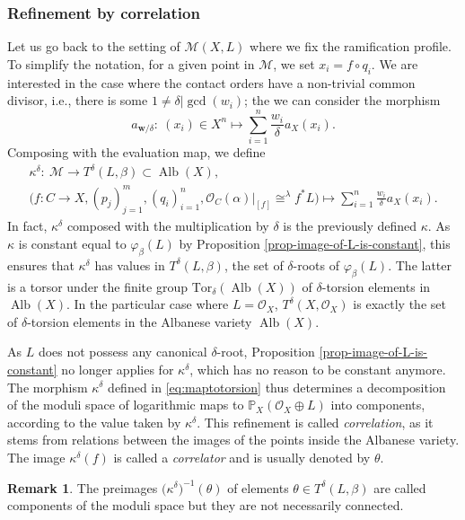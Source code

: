 \documentclass[pdftex]{sigma}
\newcommand{\Tor}{\mathrm{Tor}}
\newcommand{\Alb}{\operatorname{Alb}}
\newcommand{\bfw}{ {\boldsymbol w} }
\newcommand{\M}{\mathcal{M}}
\renewcommand{\O}{\mathcal{O}}
\numberwithin{equation}{section}
\theoremstyle{definition}
\newtheorem{remarkk}[theo]{Remark}
\begin{document}
\subsubsection{Refinement by correlation}\label{sec:correlationrefinement}
Let us go back to the setting of $\M(X,L)$ where we fix the ramification profile. To simplify the notation, for a given point in $\M$, we set $x_i=f\circ q_i$. We are interested in the case where the contact orders have a non-trivial common divisor, i.e., there is some $1\neq\delta|\gcd(w_i)$; the we can consider the morphism
\[ a_{\bfw/\delta}\colon\ (x_i)\in X^n\longmapsto \sum_{i=1}^n \frac{w_i}{\delta}a_X(x_i). \]
Composing with the evaluation map, we define
\begin{gather}
 \kappa^\delta \colon\ \M \longrightarrow T^\delta(L,\beta)\subset\Alb(X), \nonumber\\
 \bigl(f\colon C\to X,(p_j)_{j=1}^m,(q_i)_{i=1}^n, \O_C(\alpha)\rvert_{[f]}\cong^{\lambda}f^*L\bigr) \longmapsto \sum_{i=1}^n\frac{w_i}{\delta} a_X (x_i)
.\label{eq:maptotorsion}
\end{gather}
In fact, $\kappa^\delta$ composed with the multiplication by $\delta$ is the previously defined $\kappa$. As $\kappa$ is constant equal to $\varphi_\beta(L)$ by Proposition \ref{prop-image-of-L-is-constant}, this ensures that $\kappa^\delta$ has values in $ T^\delta(L,\beta)$, the set of $\delta$-roots of $\varphi_\beta(L)$. The latter is a torsor under the finite group $\Tor_\delta(\Alb(X))$ of $\delta$-torsion elements in~$\Alb(X)$. In the particular case where $L=\mathcal O_X$, $T^\delta(X,\O_X)$ is exactly the set of $\delta$-torsion elements in the Albanese variety $\Alb(X)$.



As $L$ does not possess any canonical $\delta$-root, Proposition \ref{prop-image-of-L-is-constant} no longer applies for $\kappa^\delta$, which has no reason to be constant anymore. The morphism $\kappa^\delta$ defined in \eqref{eq:maptotorsion} thus determines a decomposition of the moduli space of logarithmic maps to $\mathbb P_X(\mathcal O_X\oplus L)$ into components, according to the value taken by $\kappa^\delta$. This refinement is called \textit{correlation}, as it stems from relations between the images of the points inside the Albanese variety. The image $\kappa^\delta(f)$ is called a \textit{correlator} and is usually denoted by $\theta$.

\begin{remarkk}
 The preimages $\bigl(\kappa^\delta\bigr)^{-1}(\theta)$ of elements $\theta\in T^\delta(L,\beta)$ are called components of the moduli space but they are not necessarily connected.
\end{remarkk}
\end{document}
